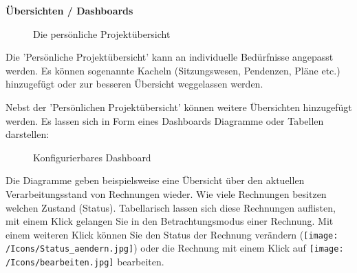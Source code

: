 \textbf{Übersichten / Dashboards}

\vspace{\baselineskip}

\begin{figure}[H]
\caption{Die persönliche Projektübersicht}
\end{figure}

Die 'Persönliche Projektübersicht' kann an individuelle Bedürfnisse angepasst werden. Es können sogenannte Kacheln (Sitzungswesen, Pendenzen, Pläne etc.) hinzugefügt oder zur besseren Übersicht weggelassen werden.

\vspace{\baselineskip}

Nebst der 'Persönlichen Projektübersicht' können weitere Übersichten hinzugefügt werden. Es lassen sich in Form eines Dashboards Diagramme oder Tabellen darstellen:

\begin{figure}[H]
\caption{Konfigurierbares Dashboard}
\end{figure}

Die Diagramme geben beispielsweise eine Übersicht über den aktuellen Verarbeitungsstand von Rechnungen wieder. Wie viele Rechnungen besitzen welchen Zustand (Status). Tabellarisch lassen sich diese Rechnungen auflisten, mit einem Klick gelangen Sie in den Betrachtungsmodus einer Rechnung. Mit einem weiteren Klick können Sie den Status der Rechnung verändern (\texttt{[image: /Icons/Status\_aendern.jpg]}) oder die Rechnung mit einem Klick auf \texttt{[image: /Icons/bearbeiten.jpg]} bearbeiten.

